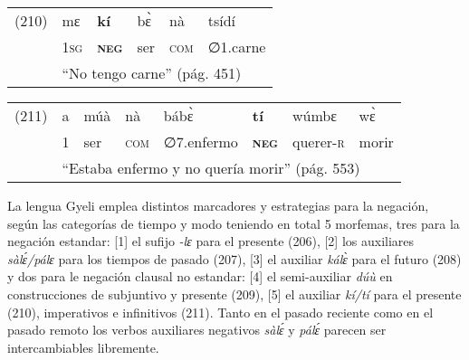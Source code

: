 {%
\begin{tabular}{llllll}
(210) & mɛ & \textbf{kí} & bɛ̀ & nà & tsídí \\
& \textsc{1sg} & \textsc{\textbf{neg}} & ser & \textsc{com} & \textsc{∅1.}carne \\
& \multicolumn{5}{l}{``No tengo carne'' (pág. 451)}
\end{tabular} \vspace{0.3cm}

\begin{tabular}{llllllll}
(211) & a & múà & nà & bábɛ̀ & \textbf{tí} & wúmbɛ & wɛ̀ \\
& 1 & ser & \textsc{com} & \textsc{∅7.}enfermo & \textsc{\textbf{neg}} & querer-\textsc{r} & morir \\
& \multicolumn{7}{l}{``Estaba enfermo y no quería morir'' (pág. 553)}
\end{tabular} \vspace{0.5cm}

}

La lengua Gyeli emplea distintos marcadores y estrategias para la negación, según las categorías de tiempo y modo \textcolor{MidnightBlue}{\citep{gyeli}} teniendo en total 5 morfemas, tres para la negación estandar: [1] el sufijo {\setmainfont{Charis SIL} \textit{-lɛ}} para el presente (206), [2] los auxiliares {\setmainfont{Charis SIL} \textit{sàlɛ́/pálɛ}} para los tiempos de pasado (207), [3] el auxiliar {\setmainfont{Charis SIL} \textit{kálɛ̀}} para el futuro (208) y dos para le negación clausal no estandar: [4] el semi-auxiliar {\setmainfont{Charis SIL} \textit{dúù}} en construcciones de subjuntivo y presente (209), [5] el auxiliar {\setmainfont{Charis SIL} \textit{kí/tí}} para el presente (210), imperativos e infinitivos (211). Tanto en el pasado reciente como en el pasado remoto los verbos auxiliares negativos {\setmainfont{Charis SIL} \textit{sàlɛ́}} y {\setmainfont{Charis SIL} \textit{pálɛ́}} parecen ser intercambiables libremente.